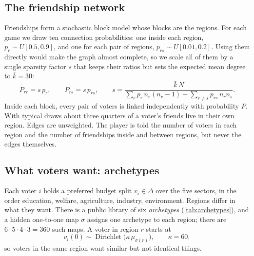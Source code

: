 \documentclass[11pt,a4paper,oneside]{report}
\newcommand{\simplex}{\Delta}
\begin{document}
\subsection{The friendship network}

Friendships form a stochastic block model whose blocks are the regions. For each game we draw ten
connection probabilities: one inside each region, $p_r \sim U[0.5, 0.9]$, and one for each pair of
regions, $p_{rs} \sim U[0.01, 0.2]$. Using them directly would make the graph almost complete, so we scale
all of them by a single sparsity factor $s$ that keeps their ratios but sets the expected mean degree to
$\bar k = 30$:
\begin{equation}
  P_{rr} = s\,p_r, \qquad P_{rs} = s\,p_{rs}, \qquad
  s = \frac{\bar k\,N}{\sum_r p_r\,n_r(n_r-1) + \sum_{r\neq s} p_{rs}\,n_r n_s}.
\end{equation}
Inside each block, every pair of voters is linked independently with probability $P$. With typical draws
about three quarters of a voter's friends live in their own region. Edges are unweighted. The player is
told the number of voters in each region and the number of friendships inside and between regions, but
never the edges themselves.

\subsection{What voters want: archetypes}

Each voter $i$ holds a preferred budget split $v_i \in \simplex$ over the five sectors, in the order
education, welfare, agriculture, industry, environment. Regions differ in what they want. There is a
public library of six \emph{archetypes} (\cref{tab:archetypes}), and a hidden one-to-one map $\sigma$
assigns one archetype to each region; there are $6\cdot5\cdot4\cdot3 = 360$ such maps. A voter in region
$r$ starts at
\begin{equation}
  v_i(0) \sim \operatorname{Dirichlet}\bigl(\kappa\,\mu_{\sigma(r)}\bigr), \qquad \kappa = 60,
\end{equation}
so voters in the same region want similar but not identical things.
\end{document}
